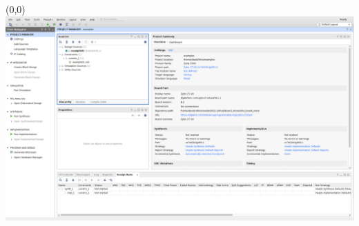 \documentclass[aspectratio=169]{beamer}
\begin{document}
\begin{frame}[fragile,t]
    \begin{textblock}{75}(0,0) \includegraphics[scale=0.237]{img/vivado/14_main_menu.png} \end{textblock}
\end{frame}
\end{document}
